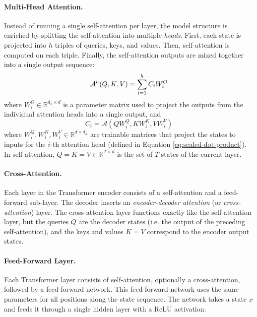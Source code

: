 \paragraph{Multi-Head Attention.} Instead of running a single self-attention
per layer, the model structure is enriched by splitting the self-attention into
multiple \emph{heads}. First, each state is projected into $h$ triples of
queries, keys, and values. Then, self-attention is computed on each triple.
Finally, the self-attention outputs are mixed together into a single output
sequence:
%
\begin{equation}
  \mathcal{A}^h(Q, K, V) = \sum_{i=1}^h C_i W_i^O \\
\end{equation}
%
where $W_i^O \in \mathbb{R}^{d_h \times d}$ is a parameter matrix used to
project the outputs from the individual attention heads into a single output,
and
%
\begin{equation}
  C_i = \mathcal{A}(QW_i^Q, KW_i^K, VW_i^V)
\end{equation}
where $W_i^Q, W_i^K, W_i^V \in \mathbb{R}^{d \times d_h}$ are trainable
matrices that project the states to inputs for the $i$-th attention head
(defined in Equation \ref{eq:scaled-dot-product}). In self-attention,
$Q = K = V \in \mathbb{R}^{T \times d}$ is the set of $T$ states of the current
layer.

\paragraph{Cross-Attention.} Each layer in the Transformer encoder consists of
a self-attention and a feed-forward sub-layer. The decoder inserts an
\emph{encoder-decoder attention} (or \emph{cross-attention}) layer.  The
cross-attention layer functions exactly like the self-attention layer, but the
queries $Q$ are the decoder states (i.e. the output of the preceding
self-attention), and the keys and values $K = V$ correspond to the encoder
output states.

\paragraph{Feed-Forward Layer.} Each Transformer layer consists
of self-attention, optionally a cross-attention, followed by a feed-forward
network. This feed-forward network uses the same parameters for all positions
along the state sequence. The network takes a state $x$ and feeds it through a
single hidden layer with a ReLU activation:

